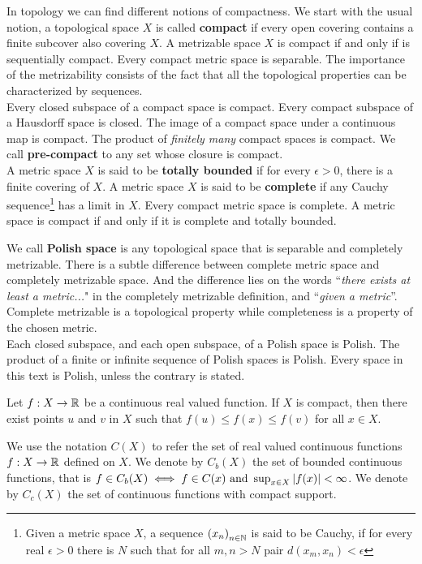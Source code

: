 In topology we can find different notions of compactness. We start with the usual notion, a topological space $X$ is called \textbf{compact} if every open covering contains a finite subcover also covering $X$. A metrizable space $X$ is compact if and only if is sequentially compact. Every compact metric space is separable. The importance of the metrizability consists of the fact that all the topological properties can be characterized by sequences. \\


Every closed subspace of a compact space is compact. Every compact subspace of a Hausdorff space is closed. The image of a compact space under a continuous map is compact. The product of \emph{finitely many} compact spaces is compact. We call \textbf{pre-compact} to any set whose closure is compact. \\

A metric space $X$ is said to be \textbf{totally bounded} if for every $\epsilon>0$, there is a finite covering of $X$. A metric space $X$ is said to be \textbf{complete} if any Cauchy sequence\footnote{Given a metric space $X$, a sequence $\left( x_n \right)_{n\in\mathbb{N}}$ is said to be Cauchy, if for every real $\epsilon>0$ there is $N$ such that for all $m,n>N$ pair $d(x_m, x_n)<\epsilon$} has a limit in $X$. Every compact metric space is complete. 
A metric space is compact if and only if it is complete and totally bounded.

We call \textbf{Polish space} is any topological space that is separable and completely metrizable. There is a subtle difference between complete metric space and completely metrizable space.  And the difference lies on the words ``\textit{there exists at least a metric...}" in the completely metrizable definition, and ``\textit{given a metric}''. Complete metrizable is a topological property while completeness is a property of the chosen metric.\\

Each closed subspace, and each open subspace, of a Polish space is Polish. The product of a finite or infinite sequence of Polish spaces is Polish. Every space in this text is Polish, unless the contrary is stated.

\begin{theorem}
	Let $f:X\rightarrow \mathbb{R}$ be a continuous real valued function. If $X$ is compact, then there exist points $u$ and $v$ in $X$ such that $f(u)\leq f(x)\leq f(v)$ for all $x\in X$.
\end{theorem}
 We use the notation $C(X)$ to refer the set of real valued continuous functions $f:X\rightarrow \mathbb{R}$ defined on $X$. We denote by $C_b(X)$ the set of bounded continuous functions, that is $f\in C_b(X) \iff f\in C(x)\ \mathrm{and}\ \sup_{x\in X} \left| f(x) \right|<\infty$. We denote by $C_c(X)$ the set of continuous functions with compact support. \\
  
